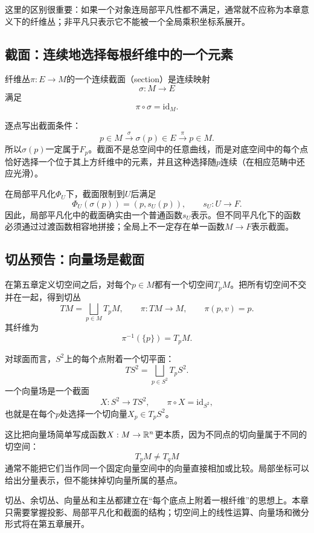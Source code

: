 这里的区别很重要：如果一个对象连局部平凡性都不满足，通常就不应称为本章意义下的纤维丛；非平凡只表示它不能被一个全局乘积坐标系展开。

\subsection{截面：连续地选择每根纤维中的一个元素}

\begin{definition}[截面]
纤维丛$\pi:E\to M$的一个连续截面（section）是连续映射
\[
    \sigma:M\longrightarrow E
\]
满足
\[
    \pi\circ\sigma=\mathrm{id}_M.
\]
\end{definition}

逐点写出截面条件：
\[
    p\in M
    \xrightarrow{\ \sigma\ }\sigma(p)\in E
    \xrightarrow{\ \pi\ }p\in M.
\]
所以$\sigma(p)$一定属于$F_p$。截面不是总空间中的任意曲线，而是对底空间中的每个点恰好选择一个位于其上方纤维中的元素，并且这种选择随$p$连续（在相应范畴中还应光滑）。

在局部平凡化$\Phi_U$下，截面限制到$U$后满足
\[
    \Phi_U(\sigma(p))=(p,s_U(p)),
    \qquad
    s_U:U\to F.
\]
因此，局部平凡化中的截面确实由一个普通函数$s_U$表示。但不同平凡化下的函数必须通过过渡函数相容地拼接；全局上不一定存在单一函数$M\to F$表示截面。

\subsection{切丛预告：向量场是截面}

在第五章定义切空间之后，对每个$p\in M$都有一个切空间$T_pM$。把所有切空间不交并在一起，得到切丛
\[
    TM=\bigsqcup_{p\in M}T_pM,
    \qquad
    \pi:TM\to M,
    \qquad
    \pi(p,v)=p.
\]
其纤维为
\[
    \pi^{-1}(\{p\})=T_pM.
\]

对球面而言，$S^2$上的每个点附着一个切平面：
\[
    TS^2=\bigsqcup_{p\in S^2}T_pS^2.
\]
一个向量场是一个截面
\[
    X:S^2\to TS^2,
    \qquad
    \pi\circ X=\mathrm{id}_{S^2},
\]
也就是在每个$p$处选择一个切向量$X_p\in T_pS^2$。

这比把向量场简单写成函数$X:M\to\mathbb{R}^n$更本质，因为不同点的切向量属于不同的切空间：
\[
    T_pM\neq T_qM
\]
通常不能把它们当作同一个固定向量空间中的向量直接相加或比较。局部坐标可以给出分量表示，但不能抹掉切向量所属的基点。

\begin{remark}[为什么纤维丛先作为预告]
切丛、余切丛、向量丛和主丛都建立在“每个底点上附着一根纤维”的思想上。本章只需要掌握投影、局部平凡化和截面的结构；切空间上的线性运算、向量场和微分形式将在第五章展开。
\end{remark}

